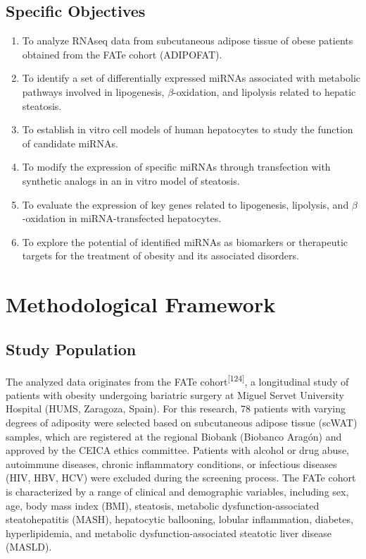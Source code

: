 \documentclass[
  11pt,
  letterpaper,
]{book}
\begin{document}
\section{Specific Objectives}\label{specific-objectives}

\begin{enumerate}
\def\labelenumi{\arabic{enumi}.}
\item
  To analyze RNAseq data from subcutaneous adipose tissue of obese
  patients obtained from the FATe cohort (ADIPOFAT).
\item
  To identify a set of differentially expressed miRNAs associated with
  metabolic pathways involved in lipogenesis, \(\beta\)-oxidation, and
  lipolysis related to hepatic steatosis.
\item
  To establish in vitro cell models of human hepatocytes to study the
  function of candidate miRNAs.
\item
  To modify the expression of specific miRNAs through transfection with
  synthetic analogs in an in vitro model of steatosis.
\item
  To evaluate the expression of key genes related to lipogenesis,
  lipolysis, and \(\beta\)-oxidation in miRNA-transfected hepatocytes.
\item
  To explore the potential of identified miRNAs as biomarkers or
  therapeutic targets for the treatment of obesity and its associated
  disorders.
\end{enumerate}

\chapter{Methodological Framework}\label{methodological-framework}

\section{Study Population}\label{study-population}

The analyzed data originates from the FATe
cohort\textsuperscript{{[}124{]}}, a longitudinal study of patients with
obesity undergoing bariatric surgery at Miguel Servet University
Hospital (HUMS, Zaragoza, Spain). For this research, 78 patients with
varying degrees of adiposity were selected based on subcutaneous adipose
tissue (scWAT) samples, which are registered at the regional Biobank
(Biobanco Aragón) and approved by the CEICA ethics committee. Patients
with alcohol or drug abuse, autoimmune diseases, chronic inflammatory
conditions, or infectious diseases (HIV, HBV, HCV) were excluded during
the screening process. The FATe cohort is characterized by a range of
clinical and demographic variables, including sex, age, body mass index
(BMI), steatosis, metabolic dysfunction-associated steatohepatitis
(MASH), hepatocytic ballooning, lobular inflammation, diabetes,
hyperlipidemia, and metabolic dysfunction-associated steatotic liver
disease (MASLD).
\end{document}
